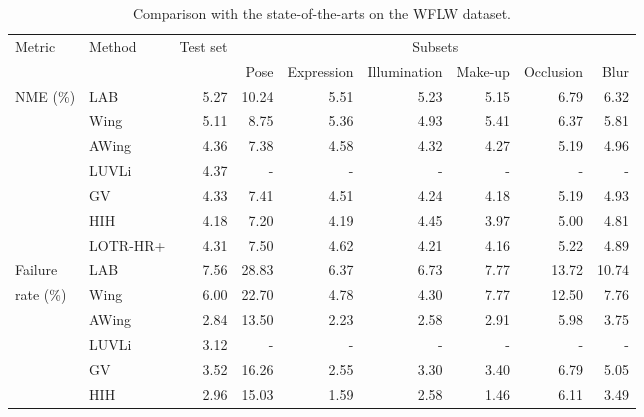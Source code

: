 \documentclass[journal]{IEEEtran}
\begin{document}
\begin{table*}
\caption{Comparison with the state-of-the-arts on the WFLW dataset.}
\centering
\begin{tabular}{llrrrrrrr}
\hline
Metric        & Method             & Test set & \multicolumn{6}{c}{Subsets}  \\
                                              \cline{4-9}
              &                    &          & Pose  & Expression & Illumination & Make-up & Occlusion & Blur  \\
\hline
NME (\%)      & LAB                &  5.27    & 10.24 &  5.51      &  5.23        &  5.15   &  6.79     &  6.32 \\
              & Wing               &  5.11    &  8.75 &  5.36      &  4.93        &  5.41   &  6.37     &  5.81 \\
              & AWing              &  4.36    &  7.38 &  4.58      &  4.32        &  4.27   &  5.19     &  4.96 \\
              & LUVLi              &  4.37    &  -    &  -         &  -           &  -      &  -        &  -    \\
              & GV                 &  4.33    &  7.41 &  4.51      &  4.24        &  4.18   &  5.19     &  4.93 \\
              & HIH                &  4.18    &  7.20 &  4.19      &  4.45        &  3.97   &  5.00     &  4.81 \\
              \cline{2-9}
              & LOTR-HR+           &  4.31    &  7.50 &  4.62      &  4.21        &  4.16   &  5.22     &  4.89 \\
\hline
Failure       & LAB                &  7.56    & 28.83 &  6.37      &  6.73        &  7.77   & 13.72     & 10.74 \\
rate (\%)     & Wing               &  6.00    & 22.70 &  4.78      &  4.30        &  7.77   & 12.50     &  7.76 \\
              & AWing              &  2.84    & 13.50 &  2.23      &  2.58        &  2.91   &  5.98     &  3.75 \\
              & LUVLi              &  3.12    &  -    &  -         &  -           &  -      &  -        &  -    \\
              & GV                 &  3.52    & 16.26 &  2.55      &  3.30        &  3.40   &  6.79     &  5.05 \\
              & HIH                &  2.96    & 15.03 &  1.59      &  2.58        &  1.46   &  6.11     &  3.49 \\
              \cline{2-9}

\end{tabular}
\end{table*}
\end{document}
